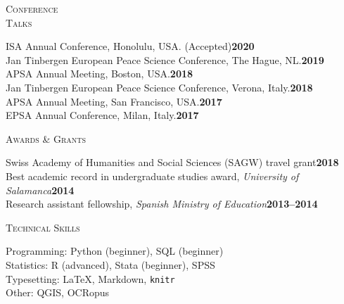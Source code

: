 \documentclass[a4paper, 11pt]{article}
\begin{document}
\noindent
\begin{minipage}[t]{0.14\textwidth}
  \flushleft
  \textsc{\small Conference\\Talks}
\end{minipage}
\begin{minipage}[t]{0.86\textwidth}
	ISA Annual Conference, Honolulu, USA. (Accepted)\hfill{\bf 2020}\\
	Jan Tinbergen European Peace Science Conference, The Hague, NL.\hfill{\bf 2019}\\
	APSA Annual Meeting, Boston, USA.\hfill{\bf 2018}\\
  Jan Tinbergen European Peace Science Conference, Verona, Italy.\hfill{\bf 2018}\\
  APSA Annual Meeting, San Francisco, USA.\hfill{\bf 2017}\\
  EPSA Annual Conference, Milan, Italy.\hfill{\bf 2017}
\end{minipage}

\vspace{20pt}


\noindent
\begin{minipage}[t]{0.14\textwidth}
  \flushleft
  \textsc{\small Awards \& Grants}
\end{minipage}
\begin{minipage}[t]{0.86\textwidth}
  Swiss Academy of Humanities and Social Sciences (SAGW) travel grant\hfill{\bf 2018}\\
  Best academic record in undergraduate studies award, {\it University of Salamanca}\hfill{\bf 2014}\\
  Research assistant fellowship, {\it Spanish Ministry of Education}\hfill{\bf 2013--2014}
\end{minipage}

\vspace{20pt}



\noindent
\begin{minipage}[t]{0.14\textwidth}
  \flushleft
  \textsc{\small Technical Skills}
\end{minipage}
\begin{minipage}[t]{0.86\textwidth}
  Programming: Python (beginner), SQL (beginner)\\
  Statistics: R (advanced), Stata (beginner), SPSS\\
  Typesetting: \LaTeX, Markdown, {\tt knitr}\\
  Other: QGIS, OCRopus
\end{minipage}
\end{document}
